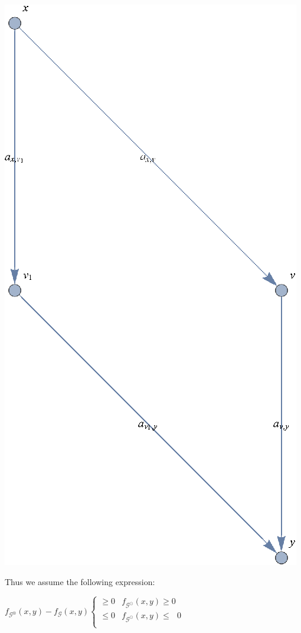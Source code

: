 \documentclass{article}
\newcounter{mathematicafigurecaption}
\begin{document}
\includegraphics{NEOID_gr4.eps}


\caption{\(\text{Figure} \arabic{mathematicafigurecaption}.\)The trust network after adding \(v\)}




Thus we assume the following expression:

\(f_{\mathcal{G}^{\otimes }}(x,y)-f_{\mathcal{G}}(x,y)\left\{
\begin{array}{cc}
 \geq 0 & f_{\mathcal{G}^{\odot }}(x,y)\geq  0 \\
 \leq 0 & f_{\mathcal{G}^{\odot }}(x,y)\leq \text{  }0 \\
\end{array}
\right.\)
\end{document}
